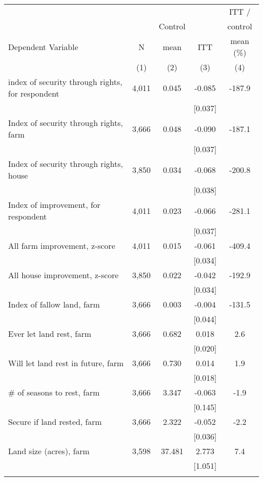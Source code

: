 \begin{tabular}{lcccc}
\hline \noalign{\smallskip} &  &  &  & ITT /\\
 &  & Control &  & control\\
Dependent Variable & N & mean & ITT & mean (\%)\\
 & (1) & (2) & (3) & (4)\\
\noalign{\smallskip}\hline \noalign{\smallskip}index of security through rights, for respondent & 4,011 & 0.045 & -0.085 & -187.9\\
 &  &  & [0.037] & \\
Index of security through rights, farm & 3,666 & 0.048 & -0.090 & -187.1\\
 &  &  & [0.037] & \\
Index of security through rights, house & 3,850 & 0.034 & -0.068 & -200.8\\
 &  &  & [0.038] & \\
Index of improvement, for respondent & 4,011 & 0.023 & -0.066 & -281.1\\
 &  &  & [0.037] & \\
All farm improvement, z-score & 4,011 & 0.015 & -0.061 & -409.4\\
 &  &  & [0.034] & \\
All house improvement, z-score & 3,850 & 0.022 & -0.042 & -192.9\\
 &  &  & [0.034] & \\
Index of fallow land, farm & 3,666 & 0.003 & -0.004 & -131.5\\
 &  &  & [0.044] & \\
Ever let land rest, farm & 3,666 & 0.682 & 0.018 & 2.6\\
 &  &  & [0.020] & \\
Will let land rest in future, farm & 3,666 & 0.730 & 0.014 & 1.9\\
 &  &  & [0.018] & \\
\# of seasons to rest, farm & 3,666 & 3.347 & -0.063 & -1.9\\
 &  &  & [0.145] & \\
Secure if land rested, farm & 3,666 & 2.322 & -0.052 & -2.2\\
 &  &  & [0.036] & \\
Land size (acres), farm & 3,598 & 37.481 & 2.773 & 7.4\\
 &  &  & [1.051] & \\
\noalign{\smallskip}\hline\end{tabular}
